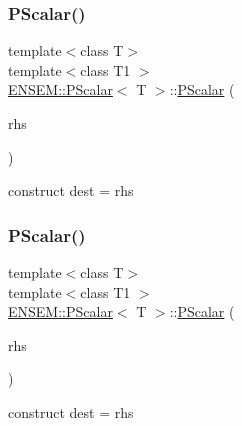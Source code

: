 \subsubsection{\texorpdfstring{PScalar()}{PScalar()}\hspace{0.1cm}{\footnotesize\ttfamily [3/18]}}
{\footnotesize\ttfamily template$<$class T$>$ \\
template$<$class T1 $>$ \\
\mbox{\hyperlink{classENSEM_1_1PScalar}{E\+N\+S\+E\+M\+::\+P\+Scalar}}$<$ T $>$\+::\mbox{\hyperlink{classENSEM_1_1PScalar}{P\+Scalar}} (\begin{DoxyParamCaption}\item[{const \mbox{\hyperlink{classENSEM_1_1PScalar}{P\+Scalar}}$<$ T1 $>$ \&}]{rhs }\end{DoxyParamCaption})\hspace{0.3cm}{\ttfamily [inline]}}



construct dest = rhs 

\mbox{\label{classENSEM_1_1PScalar_a99cdd295d67d2d32aa481a4a8d9dcc1b}} 
\subsubsection{\texorpdfstring{PScalar()}{PScalar()}\hspace{0.1cm}{\footnotesize\ttfamily [4/18]}}
{\footnotesize\ttfamily template$<$class T$>$ \\
template$<$class T1 $>$ \\
\mbox{\hyperlink{classENSEM_1_1PScalar}{E\+N\+S\+E\+M\+::\+P\+Scalar}}$<$ T $>$\+::\mbox{\hyperlink{classENSEM_1_1PScalar}{P\+Scalar}} (\begin{DoxyParamCaption}\item[{const T1 \&}]{rhs }\end{DoxyParamCaption})\hspace{0.3cm}{\ttfamily [inline]}}



construct dest = rhs 

\mbox{\label{classENSEM_1_1PScalar_a9d7f56a0caeb05ee423b451d2f3aae3b}} 
